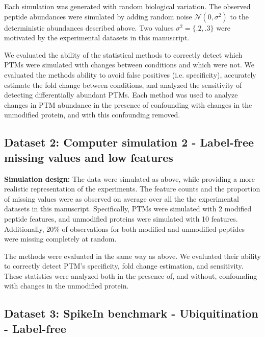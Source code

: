 \documentclass[mcp]{article}
\numberwithin{table}{section}
\begin{document}
Each simulation was generated with random biological variation. The observed peptide abundances were simulated by adding random noise $\mathcal{N}(0,\sigma^2)$ to the deterministic abundances described above. Two values $\sigma^2 = \{.2, .3\}$ were motivated by the experimental datasets in this manuscript.

\medskip {} We evaluated the ability of the statistical methods to correctly detect which PTMs were simulated with changes between conditions and which were not. We evaluated the methods ability to avoid false positives (i.e. specificity), accurately estimate the fold change between conditions, and analyzed the sensitivity of detecting differentially abundant PTMs. Each method was used to analyze changes in PTM abundance in the presence of confounding with changes in the unmodified protein, and with this confounding removed.

\subsection*{Dataset 2: Computer simulation 2 - Label-free missing values and low features}
\label{sec:comp_sim_procedure2}

{\bf Simulation design:} The data were simulated as above, while providing a more realistic representation of the experiments. The feature counts and the proportion of missing values were as observed on average over all the the experimental datasets in this manuscript. Specifically, PTMs were simulated with 2 modified peptide features, and unmodified proteins were simulated with 10 features. Additionally, 20\% of observations for both modified and unmodified peptides were missing completely at random. 

\medskip {} The methods were evaluated in the same way as above. We evaluated their ability to correctly detect PTM's specificity, fold change estimation, and sensitivity. These statistics were analyzed both in the presence of, and without, confounding with changes in the unmodified protein.
 
\subsection*{Dataset 3: SpikeIn benchmark - Ubiquitination - Label-free}
\label{sec:exp_proc_dataset3}
\end{document}
